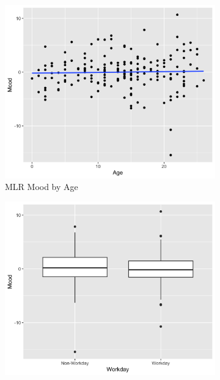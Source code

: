 \documentclass[12pt,twoside,leqno,fleqn,letterpaper]{article}
\theoremstyle{definition}
\theoremstyle{definition}
\begin{document}
                \begin{figure} 
                    \centering
                    \begin{subfigure}[b]{0.32\textwidth}
                    \centering
                    \includegraphics[width=\textwidth]{pics/mlr mood by age.png}
                    \caption[]%
                    {{\small MLR Mood by Age}}
                    \label{fig: mood v age}
                    \end{subfigure}
                    \hfill
                    \begin{subfigure}[b]{0.32\textwidth}
                    \centering
                    \includegraphics[width=\textwidth]{pics/mlr mood by day.png}

\end{subfigure}
\end{figure}
\end{document}
